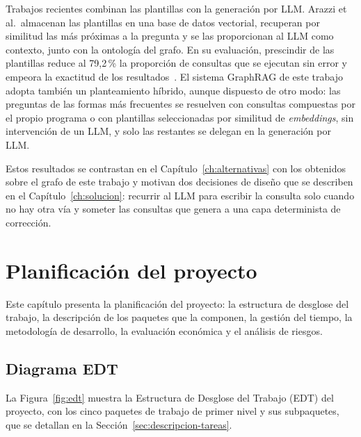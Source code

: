 \documentclass[11pt, a4paper]{report}
\begin{document}
	Trabajos recientes combinan las plantillas con la generación por LLM. Arazzi
	et al.\ almacenan las plantillas en una base de datos vectorial, recuperan
	por similitud las más próximas a la pregunta y se las proporcionan al LLM
	como contexto, junto con la ontología del grafo. En su evaluación, prescindir
	de las plantillas reduce al 79,2\,\% la proporción de
	consultas que se ejecutan sin error y empeora la exactitud de los
	resultados~\cite{arazzi2025-sparqllm}. El sistema GraphRAG de este trabajo
	adopta también un planteamiento híbrido, aunque dispuesto de otro modo: las
	preguntas de las formas más frecuentes se resuelven con consultas compuestas
	por el propio programa o con plantillas seleccionadas por similitud de
	\textit{embeddings}, sin intervención de un LLM, y solo las restantes se
	delegan en la generación por LLM.

	Estos resultados se contrastan en el Capítulo~\ref{ch:alternativas} con los
	obtenidos sobre el grafo de este trabajo y motivan dos decisiones de
	diseño que se describen en el Capítulo~\ref{ch:solucion}: recurrir al LLM
	para escribir la consulta solo cuando no hay otra vía y someter las consultas que
	genera a una capa determinista de corrección.

	\chapter{Planificación del proyecto}
	\label{ch:planificacion}

	Este capítulo presenta la planificación del proyecto: la estructura de desglose del trabajo, la descripción de los paquetes que la componen, la gestión del tiempo, la metodología de desarrollo, la evaluación económica y el análisis de riesgos.

	\section{Diagrama EDT}

	La Figura~\ref{fig:edt} muestra la Estructura de Desglose del Trabajo (EDT)
	del proyecto, con los cinco paquetes de trabajo de primer nivel y sus
	subpaquetes, que se detallan en la Sección~\ref{sec:descripcion-tareas}.
\end{document}
